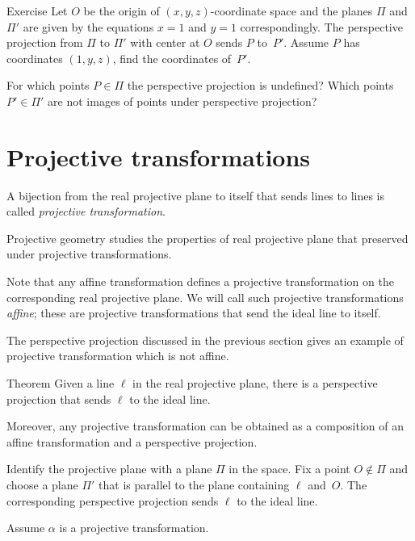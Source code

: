 \begin{thm}{Exercise}\label{ex:persect}
Let $O$ be the origin of $(x,y,z)$-coordinate space
and the planes $\Pi$ and $\Pi'$ are given by the equations
$x=1$ and $y=1$ correspondingly.
The perspective projection from $\Pi$ to $\Pi'$ with center at $O$ sends $P$ to~$P'$.
Assume $P$ has coordinates $(1,y,z)$, find the coordinates of~$P'$.

For which points $P\in \Pi$ the perspective projection is undefined?
Which points $P'\in\Pi'$ are not images of points under perspective projection?
\end{thm}

\section*{Projective transformations}

A bijection from the real projective plane to itself 
that sends lines to lines 
is called \emph{projective transformation}.

Projective geometry studies the properties of real projective plane that preserved under projective transformations.


Note that any affine transformation defines  a projective transformation on the corresponding real projective plane.
We will call such projective transformations \emph{affine}; 
these are projective transformations that send the ideal line to itself.

The perspective projection discussed in the previous section 
gives an example of projective transformation which is not affine.

\begin{thm}{Theorem}\label{thm:moving}
Given a line $\ell$ in the real projective plane, there is a perspective projection that sends $\ell$ to the ideal line.

Moreover, any projective transformation can be obtained as a composition of an affine transformation and a perspective projection.
\end{thm}

Identify the projective plane with a plane $\Pi$ in the space.
Fix a point $O\notin \Pi$ and choose a plane $\Pi'$ that is
parallel to the plane containing $\ell$ and~$O$.
The corresponding perspective projection sends $\ell$ to the ideal line.

Assume $\alpha$ is a projective transformation.

